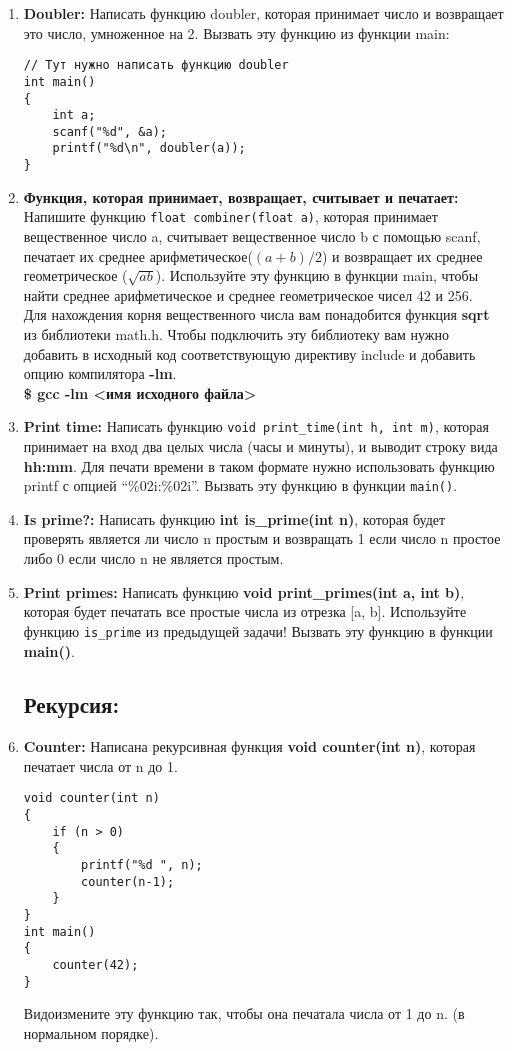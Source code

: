 \documentclass{article}
\begin{document}
\begin{enumerate}
\newpage
\item \textbf{Doubler:} Написать функцию doubler, которая принимает число и возвращает это число, умноженное на 2. Вызвать эту функцию из функции main:
\begin{lstlisting}
// Тут нужно написать функцию doubler
int main()
{
	int a;
	scanf("%d", &a);
	printf("%d\n", doubler(a));
}
\end{lstlisting}


\item \textbf{Функция, которая принимает, возвращает, считывает и печатает:} Напишите функцию \texttt{float combiner(float a)}, которая принимает вещественное число a, считывает вещественное число b с помощью scanf, печатает их среднее арифметическое($(a+b)/2$) и возвращает их среднее геометрическое ($\sqrt{a b}$). Используйте эту функцию в функции main, чтобы найти среднее арифметическое и среднее геометрическое чисел 42 и 256. \\ Для нахождения корня вещественного числа вам понадобится функция \textbf{sqrt} из библиотеки math.h. Чтобы подключить эту библиотеку вам нужно добавить в исходный код соответствующую директиву include и добавить опцию компилятора \textbf{-lm}. \\ \textbf{\$ gcc -lm <имя исходного файла>}

\item \textbf{Print time:} Написать функцию \texttt{void print\_time(int h, int m)}, которая принимает на вход два целых числа (часы и минуты), и выводит строку вида \textbf{hh:mm}. Для печати времени в таком формате нужно использовать функцию printf с опцией ``\%02i:\%02i''. Вызвать эту функцию в функции \texttt{main()}.

\item \textbf{Is prime?:} Написать функцию \textbf{int is\_prime(int n)}, которая будет проверять является ли число n простым и возвращать 1 если число n простое либо 0 если число n не является простым.
\item \textbf{Print primes:} Написать функцию \textbf{void print\_primes(int a, int b)}, которая будет печатать все простые числа из отрезка [a, b]. Используйте функцию \texttt{is\_prime} из предыдущей задачи! Вызвать эту функцию в функции \textbf{main()}.


\subsection*{Рекурсия:}
\item \textbf{Counter:} Написана рекурсивная функция \textbf{void counter(int n)}, которая печатает числа от n до 1.
\begin{lstlisting}
void counter(int n)
{
	if (n > 0)
	{
		printf("%d ", n);
		counter(n-1);
	}
}
int main()
{
	counter(42);
}
\end{lstlisting}
Видоизмените эту функцию так, чтобы она печатала числа от 1 до n. (в нормальном порядке).


\end{enumerate}
\end{document}
